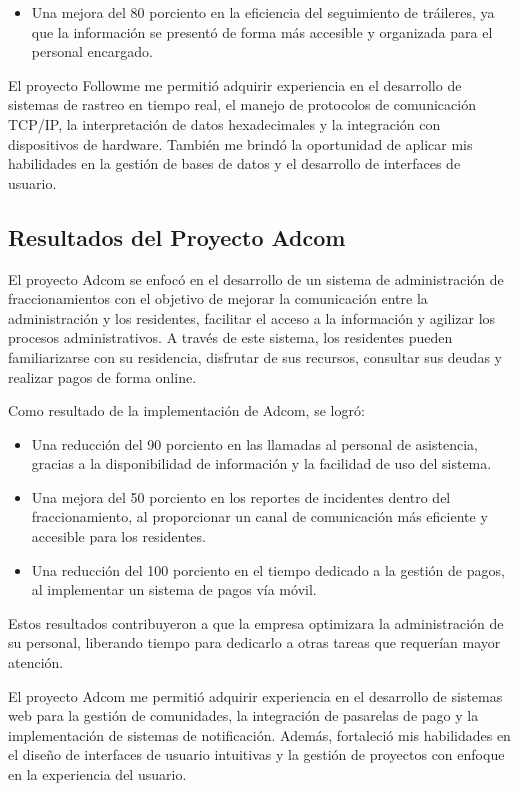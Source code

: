 \documentclass[protocolo.tex]{subfiles}
\begin{document}
\begin{itemize}
\item Una mejora del 80 porciento en la eficiencia del seguimiento de tráileres, ya que la información se  presentó  de forma más accesible y organizada para el personal encargado.
\end{itemize}

El proyecto Followme me permitió adquirir experiencia en el desarrollo de sistemas de rastreo en tiempo real, el manejo de protocolos de comunicación TCP/IP, la interpretación de datos hexadecimales y la integración con dispositivos de hardware.  También me brindó la oportunidad de aplicar mis habilidades en la gestión de bases de datos y el desarrollo de interfaces de usuario.


\subsection{Resultados del Proyecto Adcom}

El proyecto Adcom se enfocó en el desarrollo de un sistema de administración de fraccionamientos con el objetivo de  mejorar la comunicación entre la administración y los residentes,  facilitar el acceso a la información y agilizar los procesos administrativos.  A través de este sistema, los residentes pueden  familiarizarse con su residencia,  disfrutar de sus recursos,  consultar sus deudas y realizar pagos de forma online.

Como resultado de la implementación de Adcom, se logró:

\begin{itemize}
\item Una reducción del 90 porciento en las llamadas al personal de asistencia,  gracias a la disponibilidad de información y la  facilidad  de  uso  del  sistema.
\item Una mejora del 50 porciento en los reportes de incidentes dentro del fraccionamiento,  al  proporcionar  un  canal  de  comunicación  más  eficiente  y  accesible  para  los  residentes.
\item Una reducción del 100 porciento en el tiempo dedicado a la gestión de pagos,  al  implementar  un  sistema  de  pagos  vía  móvil.
\end{itemize}

Estos resultados contribuyeron a que la empresa  optimizara la administración de su personal,  liberando tiempo para dedicarlo a otras tareas que requerían  mayor  atención.

El proyecto Adcom me permitió adquirir experiencia en el desarrollo de sistemas web para la gestión de comunidades,  la integración de pasarelas de pago y la  implementación  de  sistemas  de  notificación.  Además,  fortaleció  mis  habilidades  en  el  diseño  de  interfaces  de  usuario  intuitivas  y  la  gestión  de  proyectos  con  enfoque  en  la  experiencia  del  usuario.
\end{document}
